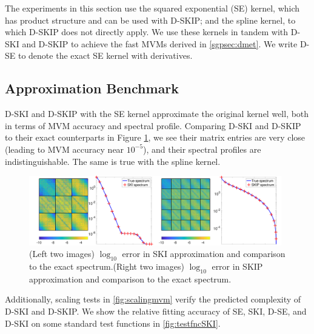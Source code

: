 The experiments in this section use the squared exponential (SE) kernel, which
has product structure and can be used with D-SKIP; and the spline kernel, to
which D\hyp{}SKIP does not directly apply. We use these kernels in tandem with
D\hyp{}SKI and D\hyp{}SKIP to achieve the fast MVMs derived in 
\cref{sgpsec:dmet}. We write D\hyp{}SE to denote the exact SE kernel with
derivatives. 

\subsection{Approximation Benchmark}

D\hyp{}SKI and D\hyp{}SKIP with the SE kernel approximate the original kernel
well, both in terms of MVM accuracy and spectral profile. Comparing D\hyp{}SKI
and D\hyp{}SKIP to their exact counterparts in Figure \ref{fig:error_ski}, we
see their matrix entries are very close (leading to MVM accuracy near $10^
{-5}$), and their spectral profiles are indistinguishable. The same is true with
the spline kernel.

\begin{figure}[ht]
  \begin{center}
    \includegraphics[width=0.98\textwidth]{./sgp/pics/ski_error}
    \caption{(Left two images) $\log_{10}$ error in SKI approximation and
    comparison to the exact spectrum.(Right two images) $\log_{10}$ error in
    SKIP approximation and comparison to the exact spectrum.}
    \label{fig:error_ski}
  \end{center}
\end{figure}

Additionally, scaling tests in \cref{fig:scalingmvm} verify the predicted
complexity of D\hyp{}SKI and D\hyp{}SKIP. We show the relative fitting accuracy
of SE, SKI, D\hyp{}SE, and D\hyp{}SKI on some standard test functions in 
\cref{fig:testfncSKI}.

